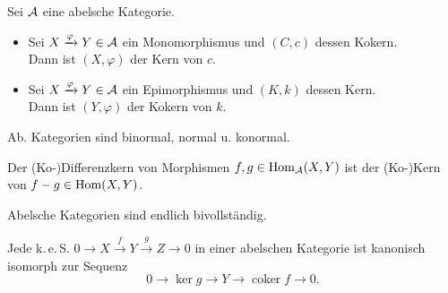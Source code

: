 \documentclass{cheat-sheet}
\newcommand{\keS}{k.\,e.\,S.} %
\DeclareMathOperator{\coker}{coker} %
\begin{document}
\begin{lem}
  Sei $\mathcal{A}$ eine abelsche Kategorie.
  \begin{itemize}
    \item Sei $X \xrightarrow{\varphi} Y \in \mathcal{A}$ ein Monomorphismus und $(C, c)$ dessen Kokern. \\
    Dann ist $(X, \varphi)$ der Kern von $c$.
    \item Sei $X \xrightarrow{\varphi} Y \in \mathcal{A}$ ein Epimorphismus und $(K, k)$ dessen Kern. \\
    Dann ist $(Y, \varphi)$ der Kokern von $k$.
  \end{itemize}
\end{lem}

\begin{kor}
  Ab. Kategorien sind binormal, \dh{} normal u. konormal.
\end{kor}

\begin{bem}
  Der (Ko-)Differenzkern von Morphismen $f, g \in \operatorname{Hom}_{\mathcal{A}}(X, Y)$ ist der (Ko-)Kern von $f - g \in \operatorname{Hom}(X, Y)$.
\end{bem}

\begin{kor}
  Abelsche Kategorien sind endlich bivollständig.
\end{kor}

\begin{lem}
  Jede \keS{} $0 \to X \xrightarrow{f} Y \xrightarrow{g} Z \to 0$ in einer abelschen Kategorie ist kanonisch isomorph zur Sequenz
  \[ 0 \to \ker g \to Y \to \coker f \to 0. \]
\end{lem}

\end{document}
